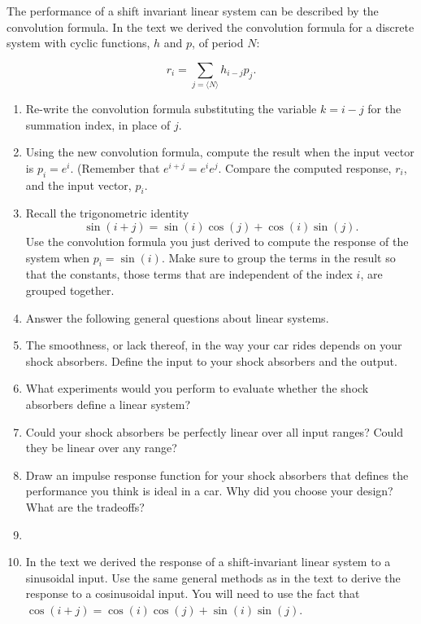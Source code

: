 \item  The performance of a shift invariant linear system can
be described by the convolution formula.
In the text we derived the convolution formula for a discrete
system with cyclic functions, $h$ and $p$, of period $N$:

\[
r_i = \sum_{j = \langle N \rangle } h_{ i - j } p_j .
\]

 \begin{enumerate}

 \item Re-write the convolution formula 
substituting the variable $k = i - j$ for the summation index,
in place of $j$.

 \item Using the new convolution formula,
compute the result when the input vector is
$p_i = e^{ i }$.
(Remember that $e^{ i + j} = e^{i} e^{j}$.
Compare the computed response, $r_i$, and the input vector, $p_i$.


 \item  Recall the trigonometric identity
\[
\sin ( i + j) = \sin (i) \cos (j) + \cos (i) \sin (j).
\]
Use the convolution formula you just derived to compute the response
of the system when $p_i = \sin (i)$.
Make sure to group the terms in the result so that the 
constants, those terms that are independent of the index $i$, 
are grouped together.

 \ee

\item Answer the following general questions about linear systems.
 \be
 \item The smoothness, or lack thereof,
in the way your car rides depends on your
shock absorbers.
Define the input to your shock absorbers and the output.
 \item What experiments would you perform to evaluate whether the shock
absorbers define a linear system?

 \item Could your shock absorbers be perfectly
linear over all input ranges?  Could they be linear
over any range?

 \item Draw an impulse response function for your
shock absorbers that defines the performance you
think is ideal in a car.  Why did you choose your design?
What are the tradeoffs?

 \ee

\item 
 \be

 \item  In the text we derived the response of a shift-invariant
linear system to a sinusoidal input.
Use the same general methods as in the text
to derive the response to a cosinusoidal input.
You will need to use the fact that $\cos(i + j) = \cos(i) \cos(j) + \sin(i) \sin(j)$.


\end{enumerate}
